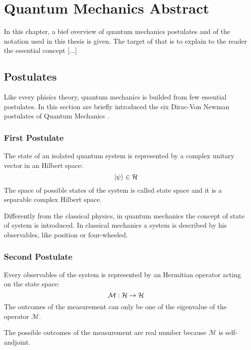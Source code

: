 \chapter{Quantum Mechanics Abstract}
    In this chapter, a bief overview of quantum mechanics postulates and
    of the notation used in this thesis is given. The target of that is 
    to explain to the reader the essential concept [...]

    \section{Postulates}
        Like every phisics theory, quantum mechanics is builded from few 
        essential postulates.
        In this section are briefly introduced the six Dirac-Von Newman 
        postulates of Quantum Mechanics \cite{quantumMec_Dirac}\cite{quantumMec_Neumann}.
        
        \subsection{First Postulate}
        \begin{postulate}
            The state of an isolated quantum system is represented by a complex unitary 
            vector in an Hilbert space:
            \begin{equation*}
                \ket{\psi} \in \mathcal{H}
            \end{equation*}
            The space of possible states of the system is called state space and it is a
            separable complex Hilbert space.
            \label{post:1}
        \end{postulate}
        \begin{observation*}
            Differently from the classical physics, in quantum mechanics the concept
            of state of system is introduced. In classical mechanics a system is 
            described by his observables, like position or four-wheeled.
        \end{observation*}
        
        \subsection{Second Postulate}
        \begin{postulate}[Observables]
            Every observables of the system is represented by an Hermitian operator
            acting on the state space:
            \begin{equation*}
                \mathcal{M}:\mathcal{H}\to\mathcal{H}
            \end{equation*}
            The outcomes of the measurement can only be one of the eigenvalue of the 
            operator $\mathcal{M}$.
            \label{post:2}
        \end{postulate}
        \begin{observation*}
            The possible outcomes of the measurement are real number because $\mathcal{M}$
            is self-andjoint. 
        \end{observation*}

